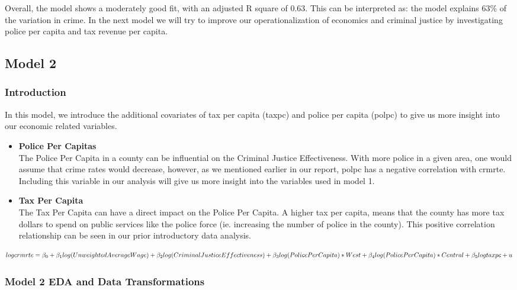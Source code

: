 \documentclass[]{article}
\begin{document}
Overall, the model shows a moderately good fit, with an adjusted R
square of 0.63. This can be interpreted as: the model explains 63\% of
the variation in crime. In the next model we will try to improve our
operationalization of economics and criminal justice by investigating
police per capita and tax revenue per capita.

\hypertarget{model-2}{%
\subsection{Model 2}\label{model-2}}

\hypertarget{introduction-2}{%
\subsubsection{Introduction}\label{introduction-2}}

In this model, we introduce the additional covariates of tax per capita
(taxpc) and police per capita (polpc) to give us more insight into our
economic related variables.

\begin{itemize}
\item
  \textbf{Police Per Capitas}\\
  The Police Per Capita in a county can be influential on the Criminal
  Justice Effectiveness. With more police in a given area, one would
  assume that crime rates would decrease, however, as we mentioned
  earlier in our report, polpc has a negative correlation with crmrte.
  Including this variable in our analysis will give us more insight into
  the variables used in model 1.
\item
  \textbf{Tax Per Capita}\\
  The Tax Per Capita can have a direct impact on the Police Per Capita.
  A higher tax per capita, means that the county has more tax dollars to
  spend on public services like the police force (ie. increasing the
  number of police in the county). This positive correlation
  relationship can be seen in our prior introductory data analysis.
\end{itemize}

\[logcrmrte = \beta_0 + \beta_1log(Unweighted Average Wage) + \beta_2log(Criminal Justice Effectiveness) + \beta_3log(Police Per Capita)*West\\ +  \beta_4log(Police Per Capita)*Central  + \beta_5logtaxpc + u\]

\hypertarget{model-2-eda-and-data-transformations}{%
\subsubsection{Model 2 EDA and Data
Transformations}\label{model-2-eda-and-data-transformations}}
\end{document}
